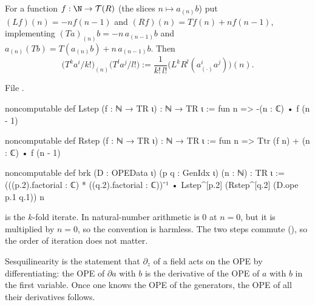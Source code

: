 \begin{definition}\label{l11:def:brk}
For a function $f:\N\to\mathcal T(R)$ (the slices $n\mapsto a_{(n)}b$) put $(L f)(n) = -n f(n-1)$ and
$(R f)(n) = T f(n)+n f(n-1)$, implementing $(Ta)_{(n)}b = -n\,a_{(n-1)}b$ and $a_{(n)}(Tb) = T(a_{(n)}b)+n\,a_{(n-1)}b$. Then
\begin{equation*}
\bigl(T^ka^i/k!\bigr)_{(n)}\bigl(T^la^j/l!\bigr) := \frac1{k!\,l!}\bigl(L^kR^l(a^i_{(\cdot)}a^j)\bigr)(n).
\end{equation*}
\end{definition}
\noindent File .
\begin{leancode}
noncomputable def Lstep (f : ℕ → TR ι) : ℕ → TR ι := fun n => -(n : ℂ) • f (n - 1)

noncomputable def Rstep (f : ℕ → TR ι) : ℕ → TR ι := fun n => Ttr (f n) + (n : ℂ) • f (n - 1)

noncomputable def brk (D : OPEData ι) (p q : GenIdx ι) (n : ℕ) : TR ι :=
  (((p.2).factorial : ℂ) * ((q.2).factorial : ℂ))⁻¹ •
    Lstep^[p.2] (Rstep^[q.2] (D.ope p.1 q.1)) n
\end{leancode}

\begin{dictionary}
 is the $k$-fold iterate. In natural-number arithmetic  is $0$ at $n=0$, but it is multiplied
by $n = 0$, so the convention is harmless. The two steps commute (), so the order of iteration does not
matter.
\end{dictionary}

\begin{physics}
Sesquilinearity is the statement that $\partial_z$ of a field acts on the OPE by differentiating: the OPE of $\partial a$ with $b$
is the derivative of the OPE of $a$ with $b$ in the first variable. Once one knows the OPE of the generators, the OPE of all
their derivatives follows.
\end{physics}

